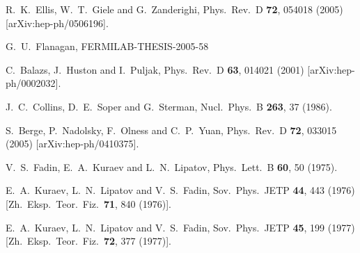 \documentclass[12pt]{iopart}
\begin{document}
\begin{thebibliography}{99}
  R.~K.~Ellis, W.~T.~Giele and G.~Zanderighi,
  Phys.\ Rev.\ D {\bf 72}, 054018 (2005)
  [arXiv:hep-ph/0506196].


  G.~U.~Flanagan,
FERMILAB-THESIS-2005-58

  C.~Balazs, J.~Huston and I.~Puljak,
  Phys.\ Rev.\ D {\bf 63}, 014021 (2001)
  [arXiv:hep-ph/0002032].

  J.~C.~Collins, D.~E.~Soper and G.~Sterman,
  Nucl.\ Phys.\ B {\bf 263}, 37 (1986).

  S.~Berge, P.~Nadolsky, F.~Olness and C.~P.~Yuan,
  Phys.\ Rev.\ D {\bf 72}, 033015 (2005)
  [arXiv:hep-ph/0410375].

  V.~S.~Fadin, E.~A.~Kuraev and L.~N.~Lipatov,
  Phys.\ Lett.\ B {\bf 60}, 50 (1975).

  E.~A.~Kuraev, L.~N.~Lipatov and V.~S.~Fadin,
  Sov.\ Phys.\ JETP {\bf 44}, 443 (1976)
  [Zh.\ Eksp.\ Teor.\ Fiz.\  {\bf 71}, 840 (1976)].

  E.~A.~Kuraev, L.~N.~Lipatov and V.~S.~Fadin,
  Sov.\ Phys.\ JETP {\bf 45}, 199 (1977)
  [Zh.\ Eksp.\ Teor.\ Fiz.\  {\bf 72}, 377 (1977)].


\end{thebibliography}
\end{document}
